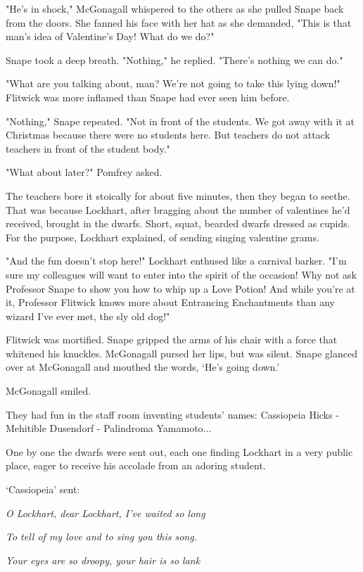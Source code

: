 \documentclass[a4paper,11pt]{article}
\begin{document}
"He's in shock," McGonagall whispered to the others as she pulled Snape back from the doors. She fanned his face with her hat as she demanded, "This is that man's idea of Valentine's Day! What do we do?"

Snape took a deep breath. "Nothing," he replied. "There's nothing we can do."

"What are you talking about, man? We're not going to take this lying down!" Flitwick was more inflamed than Snape had ever seen him before.

"Nothing," Snape repeated. "Not in front of the students. We got away with it at Christmas because there were no students here. But teachers do not attack teachers in front of the student body."

"What about later?" Pomfrey asked.

The teachers bore it stoically for about five minutes, then they began to seethe. That was because Lockhart, after bragging about the number of valentines he'd received, brought in the dwarfs. Short, squat, bearded dwarfs dressed as cupids. For the purpose, Lockhart explained, of sending singing valentine grams.

"And the fun doesn't stop here!" Lockhart enthused like a carnival barker. "I'm sure my colleagues will want to enter into the spirit of the occasion! Why not ask Professor Snape to show you how to whip up a Love Potion! And while you're at it, Professor Flitwick knows more about Entrancing Enchantments than any wizard I've ever met, the sly old dog!"

Flitwick was mortified. Snape gripped the arms of his chair with a force that whitened his knuckles. McGonagall pursed her lips, but was silent. Snape glanced over at McGonagall and mouthed the words, `He's going down.'

McGonagall smiled.

They had fun in the staff room inventing students' names: Cassiopeia Hicks - Mehitible Dusendorf - Palindroma Yamamoto...

One by one the dwarfs were sent out, each one finding Lockhart in a very public place, eager to receive his accolade from an adoring student.

`Cassiopeia' sent:

\emph{O Lockhart, dear Lockhart, I've waited so long}

\emph{To tell of my love and to sing you this song.}

\emph{Your eyes are so droopy, your hair is so lank}
\end{document}
